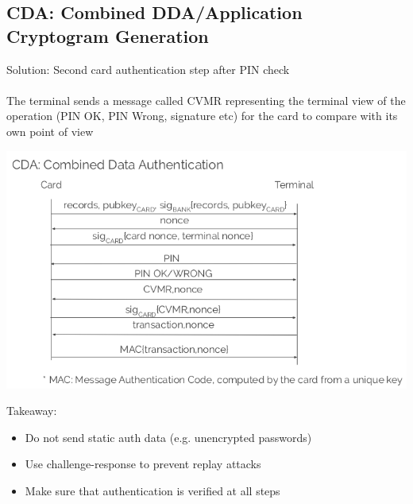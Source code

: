 \documentclass{article}[18pt]
\begin{document}
\subsection{CDA: Combined DDA/Application Cryptogram Generation}
Solution: Second card authentication step after PIN check\\
\\
The terminal sends a message called CVMR representing the terminal view of the operation (PIN OK, PIN Wrong, signature etc) for the card to compare with its own point of view
\begin{center}
	\includegraphics[scale=0.7]{CDA}
\end{center}
Takeaway:
\begin{itemize}
	\item Do not send static auth data (e.g. unencrypted passwords)
	\item Use challenge-response to prevent replay attacks
	\item Make sure that authentication is verified at all steps
\end{itemize}
\end{document}
